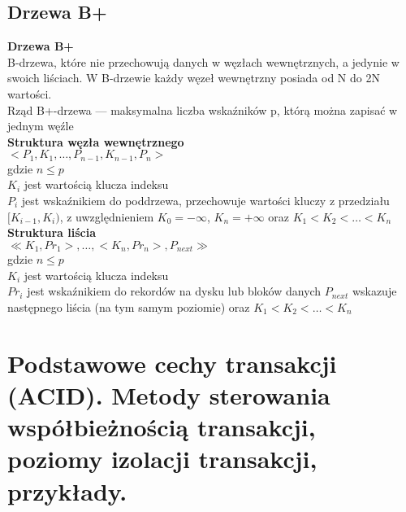 \documentclass[main.tex]{subfiles}
\begin{document}
    \subsection{Drzewa B+}
    \begin{definition}
        \textbf{Drzewa B+}\\
        B-drzewa, które nie przechowują danych w węzłach
        wewnętrznych, a jedynie w swoich liściach. W B-drzewie każdy
        węzeł wewnętrzny posiada od N do 2N wartości.\\

        Rząd B+-drzewa — maksymalna liczba wskaźników p, którą
        można zapisać w jednym węźle\\

        \textbf{Struktura węzła wewnętrznego}\\
        $< P_1,K_1,\dots, P_{n - 1},K_{n - 1}, P_n >$\\
        gdzie $n \leq p$\\
        $K_i$ jest wartością klucza indeksu\\
        $P_i$ jest wskaźnikiem do poddrzewa, przechowuje wartości kluczy z
        przedziału $[K_{i - 1},K_i)$, z uwzględnieniem $K_0 = -\infty$, $K_n = +\infty$
        oraz $K_1 < K_2 < \dots < K_n$\\

        \textbf{Struktura liścia}\\
        $\ll K_1, Pr_1 >, \dots , < K_n, Pr_n >, P_{next} \gg$\\
        gdzie $n \leq p$\\
        $K_i$ jest wartością klucza indeksu\\
        $Pr_i$ jest wskaźnikiem do rekordów na dysku lub bloków danych
        $P_{next}$ wskazuje następnego liścia (na tym samym poziomie)
        oraz
        $K_1 < K_2 < \dots < K_n$
    \end{definition}
    \newpage

    \section{Podstawowe cechy transakcji (ACID). Metody sterowania współbieżnością transakcji, poziomy izolacji transakcji, przykłady.}
\end{document}
